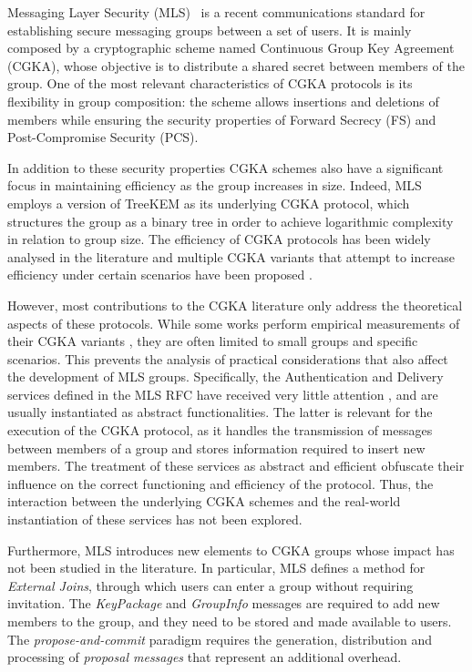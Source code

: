 \documentclass[preprint, 12pt]{elsarticle}
\begin{document}
Messaging Layer Security (MLS)~\cite{mls} is a recent communications standard for establishing secure messaging groups between a set of users. It is mainly composed by a cryptographic scheme named Continuous Group Key Agreement (CGKA), whose objective is to distribute a shared secret between members of the group. One of the most relevant characteristics of CGKA protocols is its flexibility in group composition: the scheme allows insertions and deletions of members while ensuring the security properties of Forward Secrecy (FS) and Post-Compromise Security (PCS). 

In addition to these security properties CGKA schemes also have a significant focus in maintaining efficiency as the group increases in size. Indeed, MLS employs a version of TreeKEM \cite{treekem} as its underlying CGKA protocol, which structures the group as a binary tree in order to achieve logarithmic complexity in relation to group size. The efficiency of CGKA protocols has been widely analysed in the literature \cite{cost_1, cost_2, bounds} and multiple CGKA variants that attempt to increase efficiency under certain scenarios have been proposed \cite{saik, cmpke, decaf, overlap}. 

However, most contributions to the CGKA literature only address the theoretical aspects of these protocols. While some works perform empirical measurements of their CGKA variants \cite{a_cgka, dec_ack, cost_tree}, they are often limited to small groups and specific scenarios. This prevents the analysis of practical considerations that also affect the development of MLS groups. Specifically, the Authentication and Delivery services defined in the MLS RFC have received very little attention \cite{aa_cgka}, and are usually instantiated as abstract functionalities. The latter is relevant for the execution of the CGKA protocol, as it handles the transmission of messages between members of a group and stores information required to insert new members. The treatment of these services as abstract and efficient obfuscate their influence on the correct functioning and efficiency of the protocol. Thus, the interaction between the underlying CGKA schemes and the real-world instantiation of these services has not been explored.

Furthermore, MLS introduces new elements to CGKA groups whose impact has not been studied in the literature. In particular, MLS defines a method for \textit{External Joins}, through which users can enter a group without requiring invitation. The \textit{KeyPackage} and \textit{GroupInfo} messages are required to add new members to the group, and they need to be stored and made available to users. The \textit{propose-and-commit} paradigm requires the generation, distribution and processing of \textit{proposal messages} that represent an additional overhead.
\end{document}
